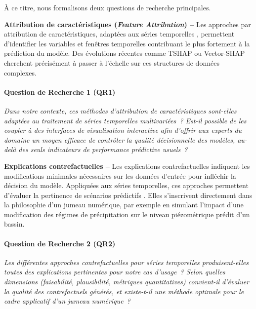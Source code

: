 À ce titre, nous formalisons deux questions de recherche principales.

\medskip
\noindent
\textbf{Attribution de caractéristiques (\textit{Feature Attribution}) --}
Les approches par attribution de caractéristiques, adaptées aux séries temporelles \cite{saadallah2021explainable, pan2021series}, permettent d'identifier les variables et fenêtres temporelles contribuant le plus fortement à la prédiction du modèle. Des évolutions récentes comme TSHAP \cite{nguyen2025tshap} ou Vector-SHAP \cite{choi2025vector} cherchent précisément à passer à l'échelle sur ces structures de données complexes.

\paragraph{Question de Recherche 1 (QR1)}
\textit{Dans notre contexte, ces méthodes d'attribution de caractéristiques sont-elles adaptées au traitement de séries temporelles multivariées~? Est-il possible de les coupler à des interfaces de visualisation interactive afin d'offrir aux experts du domaine un moyen efficace de contrôler la qualité décisionnelle des modèles, au-delà des seuls indicateurs de performance prédictive usuels~?}

\medskip
\noindent
\textbf{Explications contrefactuelles --}
Les explications contrefactuelles \cite{byrne2019counterfactuals, guidotti2024counterfactual, moreira2025benchmarking} indiquent les modifications minimales nécessaires sur les données d'entrée pour infléchir la décision du modèle. Appliquées aux séries temporelles, ces approches permettent d'évaluer la pertinence de scénarios prédictifs \cite{wang2023forecastcf, delaney2021instance, lang2023sparse}. Elles s'inscrivent directement dans la philosophie d'un jumeau numérique, par exemple en simulant l'impact d'une modification des régimes de précipitation sur le niveau piézométrique prédit d'un bassin.

\paragraph{Question de Recherche 2 (QR2)}
\textit{Les différentes approches contrefactuelles pour séries temporelles produisent-elles toutes des explications pertinentes pour notre cas d'usage~? Selon quelles dimensions (faisabilité, plausibilité, métriques quantitatives) convient-il d'évaluer la qualité des contrefactuels générés, et existe-t-il une méthode optimale pour le cadre applicatif d'un jumeau numérique~?}

